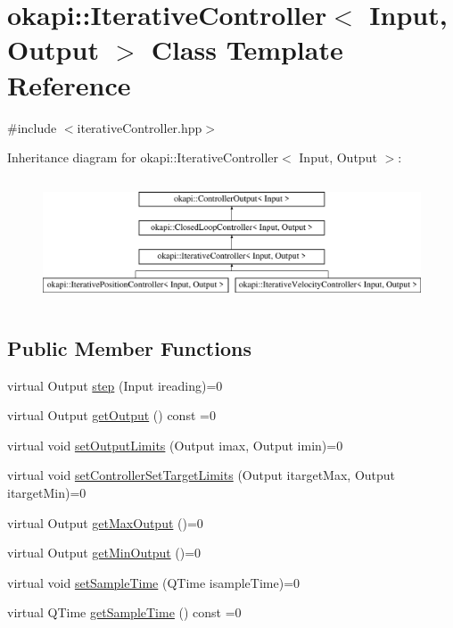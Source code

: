 \hypertarget{classokapi_1_1IterativeController}{}\section{okapi\+::Iterative\+Controller$<$ Input, Output $>$ Class Template Reference}
\label{classokapi_1_1IterativeController}


{\ttfamily \#include $<$iterative\+Controller.\+hpp$>$}

Inheritance diagram for okapi\+::Iterative\+Controller$<$ Input, Output $>$\+:\begin{figure}[H]
\begin{center}
\leavevmode
\includegraphics[height=3.733333cm]{classokapi_1_1IterativeController}
\end{center}
\end{figure}
\subsection*{Public Member Functions}
\begin{DoxyCompactItemize}
\item 
virtual Output \mbox{\hyperlink{classokapi_1_1IterativeController_a751bcad1407099e629e3ffbe395daf2b}{step}} (Input ireading)=0
\item 
virtual Output \mbox{\hyperlink{classokapi_1_1IterativeController_a83e0aac640804974f0e06936b9f7898a}{get\+Output}} () const =0
\item 
virtual void \mbox{\hyperlink{classokapi_1_1IterativeController_ae1a7d9bd29d176a26bcc70c741f0d50f}{set\+Output\+Limits}} (Output imax, Output imin)=0
\item 
virtual void \mbox{\hyperlink{classokapi_1_1IterativeController_a7c514b702b78be6c45c03b718edce035}{set\+Controller\+Set\+Target\+Limits}} (Output itarget\+Max, Output itarget\+Min)=0
\item 
virtual Output \mbox{\hyperlink{classokapi_1_1IterativeController_a09bdba3a6d7854d943ed5401210b0595}{get\+Max\+Output}} ()=0
\item 
virtual Output \mbox{\hyperlink{classokapi_1_1IterativeController_a4d271df97caeedbcc807b714a48eaa30}{get\+Min\+Output}} ()=0
\item 
virtual void \mbox{\hyperlink{classokapi_1_1IterativeController_ac4cfb1b37a3c707b2fc8f2fbda526f3e}{set\+Sample\+Time}} (Q\+Time isample\+Time)=0
\item 
virtual Q\+Time \mbox{\hyperlink{classokapi_1_1IterativeController_a48cd86626af7036db4f36b4124df4f98}{get\+Sample\+Time}} () const =0
\end{DoxyCompactItemize}


